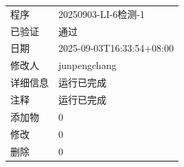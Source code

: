 \documentclass[UTF8,10pt,a4paper,fontset=fandol]{ctexart}
\newcommand{\fieldvalue}[1]{#1}
\begin{document}
\vspace{0.8em}

\begin{tabular}{@{}p{2.5cm}p{12cm}@{}}
程序 &
\fieldvalue{20250903-LI-6检测-1} \\

已验证 &
\fieldvalue{通过} \\

日期 &
\fieldvalue{2025-09-03T16:33:54+08:00} \\

修改人 &
\fieldvalue{junpengchang} \\

详细信息 &
\fieldvalue{运行已完成} \\

注释 &
\fieldvalue{运行已完成} \\

添加物 &
\fieldvalue{0} \\

修改 &
\fieldvalue{0} \\

删除 &
\fieldvalue{0} \\
\end{tabular}

\vspace{0.8em}
\end{document}
